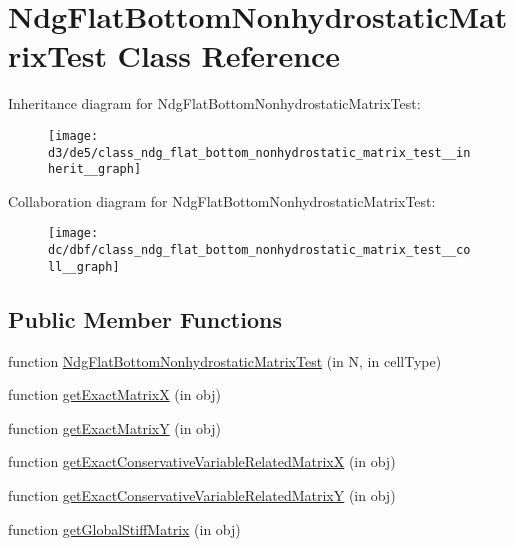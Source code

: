 \hypertarget{class_ndg_flat_bottom_nonhydrostatic_matrix_test}{}\section{Ndg\+Flat\+Bottom\+Nonhydrostatic\+Matrix\+Test Class Reference}
\label{class_ndg_flat_bottom_nonhydrostatic_matrix_test}


Inheritance diagram for Ndg\+Flat\+Bottom\+Nonhydrostatic\+Matrix\+Test\+:
\nopagebreak
\begin{figure}[H]
\begin{center}
\leavevmode
\texttt{[image: d3/de5/class\_ndg\_flat\_bottom\_nonhydrostatic\_matrix\_test\_\_inherit\_\_graph]}
\end{center}
\end{figure}


Collaboration diagram for Ndg\+Flat\+Bottom\+Nonhydrostatic\+Matrix\+Test\+:
\nopagebreak
\begin{figure}[H]
\begin{center}
\leavevmode
\texttt{[image: dc/dbf/class\_ndg\_flat\_bottom\_nonhydrostatic\_matrix\_test\_\_coll\_\_graph]}
\end{center}
\end{figure}
\subsection*{Public Member Functions}
\begin{DoxyCompactItemize}
\item 
function \hyperlink{class_ndg_flat_bottom_nonhydrostatic_matrix_test_a6508bd6bf26c8593fd174520aef5cadd}{Ndg\+Flat\+Bottom\+Nonhydrostatic\+Matrix\+Test} (in N, in cell\+Type)
\item 
function \hyperlink{class_ndg_flat_bottom_nonhydrostatic_matrix_test_ad7b8434856ba1aaa0fbaae7f1d3eae4f}{get\+Exact\+MatrixX} (in obj)
\item 
function \hyperlink{class_ndg_flat_bottom_nonhydrostatic_matrix_test_aa253e222e4e201964cfca8cc523be6c6}{get\+Exact\+MatrixY} (in obj)
\item 
function \hyperlink{class_ndg_flat_bottom_nonhydrostatic_matrix_test_a02bf0a3e0b935d5be65e99410caabbc7}{get\+Exact\+Conservative\+Variable\+Related\+MatrixX} (in obj)
\item 
function \hyperlink{class_ndg_flat_bottom_nonhydrostatic_matrix_test_a91205c125018831ad4001967dbf1f3b6}{get\+Exact\+Conservative\+Variable\+Related\+MatrixY} (in obj)
\item 
function \hyperlink{class_ndg_flat_bottom_nonhydrostatic_matrix_test_ad02ba58a704ad48ef19fb0b49f56c783}{get\+Global\+Stiff\+Matrix} (in obj)
\end{DoxyCompactItemize}
